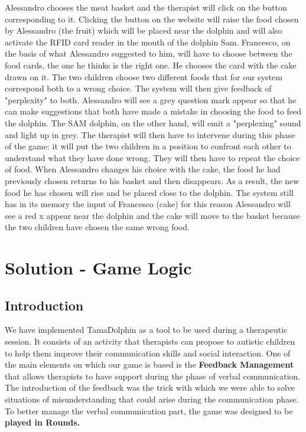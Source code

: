 \documentclass [12pt]{article}
\begin{document}
\begin{enumerate}
\begin{enumerate}
Alessandro chooses the meat basket and the therapist will click on the button corresponding to it. Clicking the button on the website will raise the food chosen by Alessandro (the fruit) which will be placed near the dolphin and will also activate the RFID card reader in the mouth of the dolphin Sam.  Francesco, on the basis of what Alessandro suggested to him, will have to choose between the food cards, the one he thinks is the right one.  He chooses the card with the cake drawn on it. The two children choose two different foods that for our system correspond both to a wrong choice. The system will then give feedback of "perplexity" to both. Alessandro will see a grey question mark appear so that he can make suggestions that both have made a mistake in choosing the food to feed the dolphin. The SAM dolphin, on the other hand, will emit a "perplexing" sound and light up in grey. The therapist will then have to intervene during this phase of the game: it will put the two children in a position to confront each other to understand what they have done wrong.  They will then have to repeat the choice of food.  When Alessandro changes his choice with the cake, the food he had previously chosen returns to his basket and then disappears. As a result, the new food he has chosen will rise and be placed close to the dolphin. The system still has in its memory the input of Francesco (cake) for this reason Alessandro will see a red x appear near the dolphin and the cake will move to the basket because the two children have chosen the same wrong food.
\end{enumerate}
\end{enumerate}
\section{Solution - Game Logic}
\subsection{Introduction}
We have implemented TamaDolphin as a tool to be used during a therapeutic session. It consists of an activity that therapists can propose to autistic children to help them improve their communication skills and social interaction. One of the main elements on which our game is based is the \textbf{Feedback Management } that allows therapists to have support during the phase of verbal communication. 
The introduction of the feedback was the trick with which we were able to solve situations of misunderstanding that could arise during the communication phase. To better manage the verbal communication part, the game was designed to be \textbf{played in Rounds.}
\end{document}

